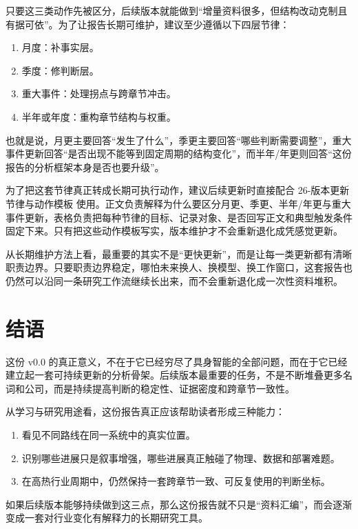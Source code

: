只要这三类动作先被区分，后续版本就能做到“增量资料很多，但结构改动克制且有据可依”。为了让报告长期可维护，建议至少遵循以下四层节律：

\begin{enumerate}
\item 月度：补事实层。
\item 季度：修判断层。
\item 重大事件：处理拐点与跨章节冲击。
\item 半年或年度：重构章节结构与权重。
\end{enumerate}

也就是说，月更主要回答“发生了什么”，季更主要回答“哪些判断需要调整”，重大事件更新回答“是否出现不能等到固定周期的结构变化”，而半年/年更则回答“这份报告的分析框架本身是否也要升级”。

为了把这套节律真正转成长期可执行动作，建议后续更新时直接配合 26-版本更新节律与动作模板 使用。正文负责解释为什么要区分月更、季更、半年/年更与重大事件更新，表格负责把每种节律的目标、记录对象、是否回写正文和典型触发条件固定下来。只有把这些动作模板写实，版本维护才不会重新退化成凭感觉更新。

从长期维护方法上看，最重要的其实不是“更快更新”，而是让每一类更新都有清晰职责边界。只要职责边界稳定，哪怕未来换人、换模型、换工作窗口，这套报告也仍然可以沿同一条研究工作流继续长出来，而不会重新退化成一次性资料堆积。

\section*{结语}

这份 v0.0 的真正意义，不在于它已经穷尽了具身智能的全部问题，而在于它已经建立起一套可持续更新的分析骨架。后续版本最重要的任务，不是不断堆叠更多名词和公司，而是持续提高判断的稳定性、证据密度和跨章节一致性。

从学习与研究用途看，这份报告真正应该帮助读者形成三种能力：

\begin{enumerate}
\item 看见不同路线在同一系统中的真实位置。
\item 识别哪些进展只是叙事增强，哪些进展真正触碰了物理、数据和部署难题。
\item 在高热行业周期中，仍然保持一套跨章节一致、可反复使用的判断坐标。
\end{enumerate}

如果后续版本能够持续做到这三点，那么这份报告就不只是“资料汇编”，而会逐渐变成一套对行业变化有解释力的长期研究工具。

